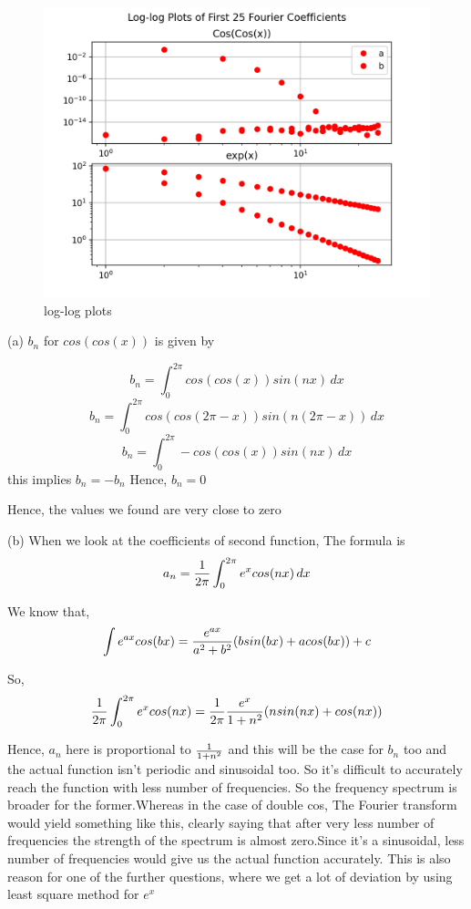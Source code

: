 \documentclass[12pt, a4paper]{report}
\begin{document}
\begin{figure}[!tbh]
   	\centering
   	\includegraphics[scale=0.75]{Q3b.png}
	\caption{log-log plots}
   	\label{fig:trueMatrix}
   \end{figure} 
(a)  $b_n$ for $cos(cos(x))$ is given by\newline

\[ b_n= \int_{0}^{2\pi} cos(cos(x)) sin(nx) \,dx \]
\[ b_n= \int_{0}^{2\pi} cos(cos(2\pi-x)) sin(n(2\pi-x)) \,dx \]
\[ b_n= \int_{0}^{2\pi} -cos(cos(x)) sin(nx) \,dx \]
this implies
$b_n = -b_n$
Hence, $b_n = 0$

Hence, the values we found are very close to zero\newline

(b) When we look at the coefficients of second function, The formula is 
\begin{equation}
a_n  = {1\over 2\pi}\int_{0}^{2\pi} e^x cos(nx) \,dx 
\end{equation}

We know that,
\begin{equation}
\int {e^{ax}cos(bx)} = {e^{ax}\over{a^2 + b^2}}(b sin(bx) + a cos(bx)) +c
\end{equation}

So,
\begin{equation}
 {1\over 2\pi}\int_{0}^ {2\pi} {e^{x}cos(nx)} =  {1\over 2\pi} {e^{x}\over{1 + n^2}}(n sin(nx) + cos(nx))
\end{equation}

Hence, $a_n$ here is proportional to ${1\over{1+n^2}}$ and this will be the case for $b_n$ too and the actual function isn't periodic and sinusoidal too. So it's difficult to accurately reach the function with less number of frequencies. So the frequency spectrum is broader for the former.Whereas in the case of double cos, The Fourier transform would yield something like this, clearly saying that after very less number of frequencies the strength of the spectrum is almost zero.Since it's a sinusoidal, less number of frequencies would give us the actual function accurately. This is also reason for one of the further questions, where we get a lot of deviation by using least square method for $e^x$\newline
\end{document}
